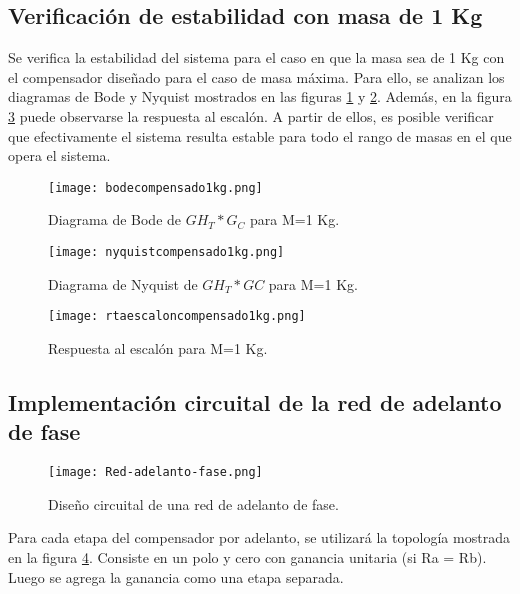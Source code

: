 \subsection{Verificación de estabilidad con masa de 1 Kg}

\noindent Se verifica la estabilidad del sistema  para el caso en que la masa sea de 1 Kg con el compensador dise\~{n}ado para el caso de masa m\'{a}xima. Para ello, se analizan los diagramas de Bode y Nyquist mostrados en las figuras \ref{fig:bode-analog-para-M-1Kg} y \ref{fig:nyquist-analog-para-M-1Kg}. Adem\'{a}s, en la figura \ref{fig:respuesta-analog-al-escalon-para-M-1Kg} puede observarse la respuesta al escal\'{o}n. A partir de ellos, es posible verificar que efectivamente el sistema resulta estable para todo el rango de masas en el que opera el sistema. 


\begin{figure}[H]
	\centering
	\texttt{[image: bodecompensado1kg.png]}
	\caption{Diagrama de Bode de $GH_T*G_C$ para M=1 Kg.}
	\label{fig:bode-analog-para-M-1Kg}
\end{figure}

\begin{figure}[H]
	\centering
	\texttt{[image: nyquistcompensado1kg.png]}
	\caption{Diagrama de Nyquist de $GH_T*GC$ para M=1 Kg.}
	\label{fig:nyquist-analog-para-M-1Kg}
\end{figure}

\begin{figure}[H]
	\centering
	\texttt{[image: rtaescaloncompensado1kg.png]}
	\caption{Respuesta al escalón para M=1 Kg.}
	\label{fig:respuesta-analog-al-escalon-para-M-1Kg}
\end{figure}

\subsection{Implementación circuital de la red de adelanto de fase}

\begin{figure}[H]
	\centering
	\texttt{[image: Red-adelanto-fase.png]}
	\caption{Diseño circuital de una red de adelanto de fase.}
	\label{fig:red-adelanto-fase}
\end{figure}


\noindent Para cada etapa del compensador por adelanto, se utilizará la topología mostrada en la figura \ref{fig:red-adelanto-fase}. Consiste en  un polo y cero con ganancia unitaria (si Ra = Rb). Luego se agrega la ganancia como una etapa separada.

